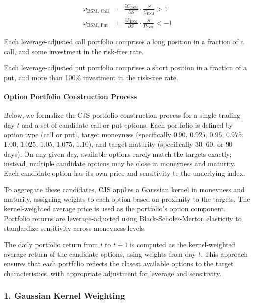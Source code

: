 \documentclass[11pt]{article}
\begin{document}
\begin{align}
\omega_{\text{BSM, Call}} &= \frac{\partial C_{\text{BSM}}}{\partial S} \cdot \frac{S}{C_{\text{BSM}}} > 1 \\
\omega_{\text{BSM, Put}}  &= \frac{\partial P_{\text{BSM}}}{\partial S} \cdot \frac{S}{P_{\text{BSM}}} < -1
\end{align}

Each leverage-adjusted call portfolio comprises a long position in a fraction of a call, and some investment in the risk-free rate.

Each leverage-adjusted put portfolio comprises a short position in a fraction of a put, and more than 100\% investment in the risk-free rate.

\paragraph{Option Portfolio Construction Process}


Below, we formalize the CJS portfolio construction process for a single trading day $t$ and a set of candidate call or put options. Each portfolio is defined by option type (call or put), target moneyness (specifically $0.90$, $0.925$, $0.95$, $0.975$, $1.00$, $1.025$, $1.05$, $1.075$, $1.10$), and target maturity (specifically $30$, $60$, or $90$ days). On any given day, available options rarely match the targets exactly; instead, multiple candidate options may be close in moneyness and maturity. Each candidate option has its own price and sensitivity to the underlying index.

To aggregate these candidates, CJS applies a Gaussian kernel in moneyness and maturity, assigning weights to each option based on proximity to the targets. The kernel-weighted average price is used as the portfolio's option component. Portfolio returns are leverage-adjusted using Black-Scholes-Merton elasticity to standardize sensitivity across moneyness levels.

The daily portfolio return from $t$ to $t+1$ is computed as the kernel-weighted average return of the candidate options, using weights from day $t$. This approach ensures that each portfolio reflects the closest available options to the target characteristics, with appropriate adjustment for leverage and sensitivity.

\subsubsection{1. Gaussian Kernel Weighting}
\end{document}
